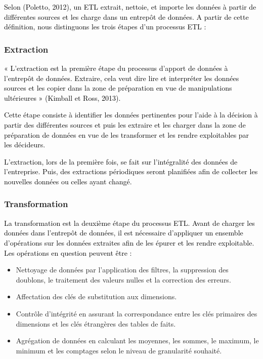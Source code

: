 \documentclass[a4paper,12pt]{report}
\begin{document}
\textcolor{black}{
Selon (Poletto, 2012), un ETL extrait, nettoie, et importe les données à partir de  différentes sources et les charge dans un entrepôt de données.}
\textcolor{black}{
A partir de cette définition, nous distinguons les trois étapes d’un processus ETL :}

\subsubsection*{Extraction}

\textcolor{black}{
 « L’extraction est la première étape du processus d'apport de données à l'entrepôt de données. Extraire, cela veut dire lire et interpréter les données sources et les copier dans la zone de préparation en vue de manipulations ultérieures » (Kimball et Ross, 2013).}

\textcolor{black}{
 Cette étape consiste à identifier les données pertinentes pour l’aide à la décision à partir des différentes sources et puis les extraire et les charger dans la zone de préparation de données en vue de les transformer et les rendre exploitables par les décideurs.}

\textcolor{black}{
 L’extraction, lors de la première fois, se fait sur l’intégralité des données de l’entreprise. Puis, des extractions périodiques seront planifiées afin de collecter les nouvelles données ou celles ayant changé.}

\subsubsection*{Transformation}

\textcolor{black}{
La transformation est la deuxième étape du processus ETL.  Avant de charger les données dans l’entrepôt de données, il est nécessaire d’appliquer un ensemble d’opérations sur les données extraites afin de les épurer et les rendre exploitable.}
\textcolor{black}{
Les opérations en question peuvent être :}

\begin{itemize}
	\item Nettoyage de données par l’application des filtres, la suppression des doublons, le traitement des valeurs nulles et la correction des erreurs.
	\item	Affectation des clés de substitution aux dimensions.
	\item	Contrôle d’intégrité en assurant la correspondance entre les clés primaires des dimensions et les clés étrangères des tables de faits.
	\item	Agrégation de données en calculant les moyennes, les sommes, le maximum, le minimum et les comptages selon le niveau de granularité souhaité.
	
\end{itemize}
\end{document}
